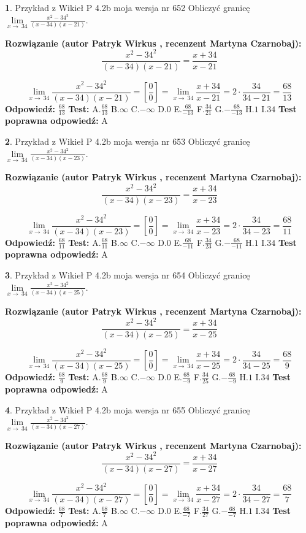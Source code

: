 \documentclass[12pt, a4paper]{article}
\theoremstyle{definition} %
\newtheorem{zad}{}
\newcommand{\zadStart}[1]{\begin{zad}#1\newline}
\newcommand{\zadStop}{\end{zad}}
\newcommand{\rozwStart}[2]{\noindent \textbf{Rozwiązanie (autor #1 , recenzent #2): }\newline}
\newcommand{\rozwStop}{\newline}
\newcommand{\odpStart}{\noindent \textbf{Odpowiedź:}\newline}
\newcommand{\odpStop}{\newline}
\newcommand{\testStart}{\noindent \textbf{Test:}\newline}
\newcommand{\testStop}{\newline}
\newcommand{\kluczStart}{\noindent \textbf{Test poprawna odpowiedź:}\newline}
\newcommand{\kluczStop}{\newline}
\begin{document}
\zadStart{Przykład z Wikieł P 4.2b moja wersja nr 652}
Obliczyć granicę $\lim\limits_{x\to\ 34}\frac{x^{2}-34^{2}}{(x-34)(x-21)}$.
\zadStop
\rozwStart{Patryk Wirkus}{Martyna Czarnobaj}
$$\frac{x^{2}-34^{2}}{(x-34)(x-21)}=\frac{x+34}{x-21}$$

$$\lim\limits_{x\to\ 34}\frac{x^{2}-34^{2}}{(x-34)(x-21)}=[\frac{0}{0}]=\lim\limits_{x\to\ 34}\frac{x+34}{x-21}=2 \cdot \frac{34}{34-21} = \frac{68}{13}$$
\rozwStop
\odpStart
$\frac{68}{13}$
\odpStop
\testStart
A.$\frac{68}{13}$
B.$\infty$
C.$-\infty$
D.$0$
E.$\frac{68}{-13}$
F.$\frac{34}{21}$
G.$-\frac{68}{-13}$
H.$1$
I.$34$
\testStop
\kluczStart
A
\kluczStop



\zadStart{Przykład z Wikieł P 4.2b moja wersja nr 653}
Obliczyć granicę $\lim\limits_{x\to\ 34}\frac{x^{2}-34^{2}}{(x-34)(x-23)}$.
\zadStop
\rozwStart{Patryk Wirkus}{Martyna Czarnobaj}
$$\frac{x^{2}-34^{2}}{(x-34)(x-23)}=\frac{x+34}{x-23}$$

$$\lim\limits_{x\to\ 34}\frac{x^{2}-34^{2}}{(x-34)(x-23)}=[\frac{0}{0}]=\lim\limits_{x\to\ 34}\frac{x+34}{x-23}=2 \cdot \frac{34}{34-23} = \frac{68}{11}$$
\rozwStop
\odpStart
$\frac{68}{11}$
\odpStop
\testStart
A.$\frac{68}{11}$
B.$\infty$
C.$-\infty$
D.$0$
E.$\frac{68}{-11}$
F.$\frac{34}{23}$
G.$-\frac{68}{-11}$
H.$1$
I.$34$
\testStop
\kluczStart
A
\kluczStop



\zadStart{Przykład z Wikieł P 4.2b moja wersja nr 654}
Obliczyć granicę $\lim\limits_{x\to\ 34}\frac{x^{2}-34^{2}}{(x-34)(x-25)}$.
\zadStop
\rozwStart{Patryk Wirkus}{Martyna Czarnobaj}
$$\frac{x^{2}-34^{2}}{(x-34)(x-25)}=\frac{x+34}{x-25}$$

$$\lim\limits_{x\to\ 34}\frac{x^{2}-34^{2}}{(x-34)(x-25)}=[\frac{0}{0}]=\lim\limits_{x\to\ 34}\frac{x+34}{x-25}=2 \cdot \frac{34}{34-25} = \frac{68}{9}$$
\rozwStop
\odpStart
$\frac{68}{9}$
\odpStop
\testStart
A.$\frac{68}{9}$
B.$\infty$
C.$-\infty$
D.$0$
E.$\frac{68}{-9}$
F.$\frac{34}{25}$
G.$-\frac{68}{-9}$
H.$1$
I.$34$
\testStop
\kluczStart
A
\kluczStop



\zadStart{Przykład z Wikieł P 4.2b moja wersja nr 655}
Obliczyć granicę $\lim\limits_{x\to\ 34}\frac{x^{2}-34^{2}}{(x-34)(x-27)}$.
\zadStop
\rozwStart{Patryk Wirkus}{Martyna Czarnobaj}
$$\frac{x^{2}-34^{2}}{(x-34)(x-27)}=\frac{x+34}{x-27}$$

$$\lim\limits_{x\to\ 34}\frac{x^{2}-34^{2}}{(x-34)(x-27)}=[\frac{0}{0}]=\lim\limits_{x\to\ 34}\frac{x+34}{x-27}=2 \cdot \frac{34}{34-27} = \frac{68}{7}$$
\rozwStop
\odpStart
$\frac{68}{7}$
\odpStop
\testStart
A.$\frac{68}{7}$
B.$\infty$
C.$-\infty$
D.$0$
E.$\frac{68}{-7}$
F.$\frac{34}{27}$
G.$-\frac{68}{-7}$
H.$1$
I.$34$
\testStop
\kluczStart
A
\kluczStop
\end{document}
